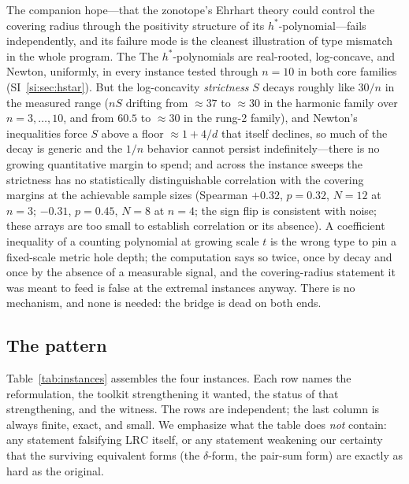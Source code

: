 \documentclass[11pt,a4paper]{article}
\numberwithin{equation}{section}
\theoremstyle{plain}
\theoremstyle{definition}
\theoremstyle{remark}
\newcommand{\lrc}{\mathrm{LRC}}
\begin{document}
The companion hope---that the zonotope's Ehrhart theory could control
the covering radius through the positivity structure of its
$h^*$-polynomial---fails independently, and its failure mode is the
cleanest illustration of type mismatch in the whole program. The
The $h^*$-polynomials are real-rooted, log-concave, and Newton, uniformly,
in every instance tested through $n=10$ in both core families
(SI~\ref{si:sec:hstar}). But the log-concavity \emph{strictness} $S$
decays roughly like $30/n$ in the measured range ($nS$ drifting from
$\approx37$ to $\approx30$ in the harmonic family over
$n=3,\dots,10$, and from $60.5$ to $\approx30$ in the rung-2 family),
and Newton's inequalities force $S$ above a floor $\approx1+4/d$ that
itself declines, so much of the decay is generic and the $1/n$ behavior
cannot persist indefinitely---there is no growing quantitative margin to
spend; and across the instance sweeps the strictness has no
statistically distinguishable correlation with the covering margins at
the achievable sample sizes (Spearman $+0.32$, $p=0.32$, $N=12$ at
$n=3$; $-0.31$, $p=0.45$, $N=8$ at $n=4$; the sign flip is consistent
with noise; these arrays are too small to establish correlation or its
absence). A
coefficient inequality of a counting polynomial at growing scale $t$ is
the wrong type to pin a fixed-scale metric hole depth; the computation
says so twice, once by decay and once by the absence of a measurable
signal, and the covering-radius statement it was meant to feed is false
at the extremal instances anyway. There is no mechanism, and none is
needed: the bridge is dead on both ends.

\subsection{The pattern}

Table~\ref{tab:instances} assembles the four instances. Each row names
the reformulation, the toolkit strengthening it wanted, the status of
that strengthening, and the witness. The rows are independent; the last
column is always finite, exact, and small. We emphasize what the table
does \emph{not} contain: any statement falsifying $\lrc$ itself, or any
statement weakening our certainty that the surviving equivalent forms
(the $\delta$-form, the pair-sum form) are exactly as hard as the
original.
\end{document}
